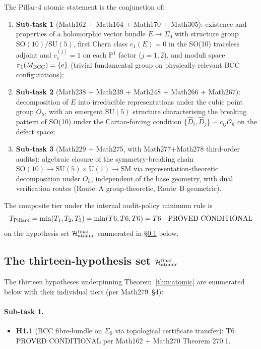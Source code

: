 \begin{theorem}
\label{thm:atomic}
The Pillar-4 atomic statement is the conjunction of:
\begin{enumerate}
\item \textbf{Sub-task 1} (Math162 + Math164 + Math170 + Math305):
existence and properties of a holomorphic vector bundle $E \to
\Sigma_0$ with structure group $\mathrm{SO}(10)/\mathrm{SU}(5)$,
first Chern class $c_1(E) = 0$ in the SO(10) traceless adjoint and
$c_1^{(j)} = 1$ on each $\mathbb{P}^1$ factor ($j = 1,2$), and
moduli space $\pi_1(M_{\rm BCC}) = \{e\}$ (trivial fundamental group
on physically relevant BCC configurations);
\item \textbf{Sub-task 2} (Math238 + Math239 + Math248 + Math266 +
Math267): decomposition of $E$ into irreducible representations
under the cubic point group $O_h$, with an emergent
$\mathrm{SU}(5)$ structure characterising the breaking pattern of
SO(10) under the Cartan-forcing condition $\{\hat{D}_i, \hat{D}_j\}
\sim c_{ij} \mathcal{O}_h$ on the defect space;
\item \textbf{Sub-task 3} (Math229 + Math275, with Math277+Math278
third-order audits): algebraic closure of the symmetry-breaking chain
$\mathrm{SO}(10) \to \mathrm{SU}(5) \times \mathrm{U}(1) \to
\mathrm{SM}$ via representation-theoretic decomposition under
$O_h$, independent of the base geometry, with dual verification
routes (Route~A group-theoretic, Route~B geometric).
\end{enumerate}
The composite tier under the internal audit-policy minimum rule is
\[
T_{\rm Pillar 4} = \min(T_1, T_2, T_3) = \min(T6, T6, T6) = T6
\quad \text{PROVED CONDITIONAL}
\]
on the hypothesis set $\mathcal{H}_{\rm atomic}^{\rm final}$ enumerated
in \S\ref{sec:hypothesis-set} below.
\end{theorem}

\subsection{The thirteen-hypothesis set
$\mathcal{H}_{\rm atomic}^{\rm final}$}\label{sec:hypothesis-set}

The thirteen hypotheses underpinning Theorem~\ref{thm:atomic} are
enumerated below with their individual tiers (per Math279~\S4):

\paragraph{Sub-task 1.}
\begin{itemize}
\item \textbf{H1.1} (BCC fibre-bundle on $\Sigma_0$ via topological
certificate transfer): T6 PROVED CONDITIONAL per Math162 + Math270
Theorem 270.1.
\end{itemize}

